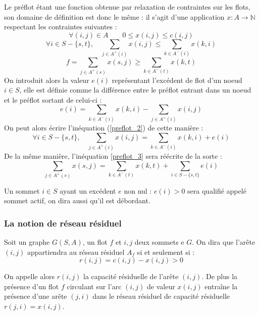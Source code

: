Le préflot étant une fonction obtenue par relaxation de contraintes sur les flots, son
domaine de définition est donc le même : il s'agit d'une application $x : A \rightarrow \mathbb{N}$
respectant les contraintes suivantes :
		\begin{equation}
			\label{preflot_1}
			\forall (i,j) \in A \qquad 0 \leq x(i,j) \leq c(i,j)
		\end{equation}
		\begin{equation} 
			\label{preflot_2}
			\forall i \in S - \{s,t\},\quad \sum_{j \in A^+(i)} x(i,j) \leq \sum_{k \in A^-(i)} x(k,i)
		\end{equation}
		\begin{equation}
			\label{preflot_3}
			f = \sum_{j \in A^+(s)} x(s,j) \geq \sum_{k \in A^-(t)} x(k, t)
		\end{equation}
On introduit alors la valeur $e(i)$ représentant l'excédent de flot d'un noeud $i \in S$, elle est
définie comme la différence entre le préflot entrant dans un noeud et le préflot sortant de celui-ci
: \begin{equation}
	e(i) = \sum_{k \in A^-(i)} x(k,i) - \sum_{j \in A^+(i)} x(i,j)
\end{equation}
 On peut alors écrire l'inéquation (\ref{preflot_2}) de cette manière :
\begin{equation} 
\forall i \in S - \{s,t\},\quad \sum_{j \in A^+(i)} x(i,j) = \sum_{k \in A^-(i)} x(k,i) + e(i)
\end{equation}
De la même manière, l'inéquation \ref{preflot_3} sera réécrite de la sorte :
\begin{equation}
\sum_{j \in A^+(s)} x(s,j) = \sum_{k \in A^-(t)} x(k, t) + \sum_{i \in S-\{s,t\}} e(i)
\end{equation}

Un sommet $i \in S$ ayant un excédent $e$ non nul : $e(i) > 0$ sera qualifié appelé sommet actif, on
dira aussi qu'il est débordant.

\subsubsection{La notion de réseau résiduel}

Soit un graphe $G(S, A)$, un flot $f$ et $i,j$ deux sommets e $G$. On dira que l'arête
$(i,j)$ appartiendra au réseau résiduel $A_f$ si et seulement si :
\begin{equation}
	 r(i,j) = c(i,j) - x(i,j) > 0
\end{equation}

On appelle alors $r(i,j)$ la capacité résiduelle de l'arête $(i,j)$. De plus la présence d'un flot
$f$ circulant sur l'arc $(i,j)$ de valeur $x(i,j)$ entraîne la présence d'une arête $(j,i)$
dans le réseau résiduel de capacité résiduelle $r(j,i) = x(i,j)$. 

